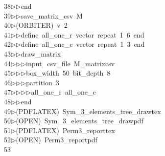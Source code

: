\begin{tabbing}
38\>$\triangleright$\>$\triangleright$\>end\ \\[0pt]
39\>$\triangleright$\>$\triangleright$\>save\_matrix\_csv\ M\ \\[0pt]
40\>$\triangleright$\>(ORBITER)\ v\ 2\ \\[0pt]
41\>$\triangleright$\>$\triangleright$\>define\ all\_one\_r\ vector\ repeat\ 1\ 6\ end\ \\[0pt]
42\>$\triangleright$\>$\triangleright$\>define\ all\_one\_c\ vector\ repeat\ 1\ 3\ end\ \\[0pt]
43\>$\triangleright$\>$\triangleright$\>draw\_matrix\ \\[0pt]
44\>$\triangleright$\>$\triangleright$\>$\triangleright$\>input\_csv\_file\ M\_matrixcsv\ \\[0pt]
45\>$\triangleright$\>$\triangleright$\>$\triangleright$\>box\_width\ 50\ bit\_depth\ 8\ \\[0pt]
46\>$\triangleright$\>$\triangleright$\>$\triangleright$\>partition\ 3\ \\[0pt]
47\>$\triangleright$\>$\triangleright$\>$\triangleright$\>$\triangleright$\>all\_one\_r\ all\_one\_c\ \\[0pt]
48\>$\triangleright$\>$\triangleright$\>end\\[0pt]
49\>$\triangleright$\>(PDFLATEX)\ Sym\_3\_elements\_tree\_drawtex\\[0pt]
50\>$\triangleright$\>(OPEN)\ Sym\_3\_elements\_tree\_drawpdf\\[0pt]
51\>$\triangleright$\>(PDFLATEX)\ Perm3\_reporttex\\[0pt]
52\>$\triangleright$\>(OPEN)\ Perm3\_reportpdf\\[0pt]
53\>\end{tabbing}
